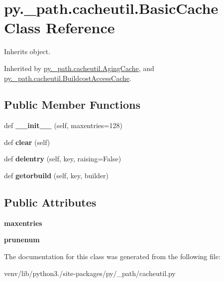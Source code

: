 \hypertarget{classpy_1_1__path_1_1cacheutil_1_1_basic_cache}{}\section{py.\+\_\+path.\+cacheutil.\+Basic\+Cache Class Reference}
\label{classpy_1_1__path_1_1cacheutil_1_1_basic_cache}


Inherits object.



Inherited by \hyperlink{classpy_1_1__path_1_1cacheutil_1_1_aging_cache}{py.\+\_\+path.\+cacheutil.\+Aging\+Cache}, and \hyperlink{classpy_1_1__path_1_1cacheutil_1_1_buildcost_access_cache}{py.\+\_\+path.\+cacheutil.\+Buildcost\+Access\+Cache}.

\subsection*{Public Member Functions}
\begin{DoxyCompactItemize}
\item 
\mbox{\label{classpy_1_1__path_1_1cacheutil_1_1_basic_cache_ac348f541d2a207ebd25786517e507b14}} 
def {\bfseries \+\_\+\+\_\+init\+\_\+\+\_\+} (self, maxentries=128)
\item 
\mbox{\label{classpy_1_1__path_1_1cacheutil_1_1_basic_cache_aa64f5769d6f6d1c17af046d76938e9eb}} 
def {\bfseries clear} (self)
\item 
\mbox{\label{classpy_1_1__path_1_1cacheutil_1_1_basic_cache_a9827fd22fc3df511ccec383e44a812f6}} 
def {\bfseries delentry} (self, key, raising=False)
\item 
\mbox{\label{classpy_1_1__path_1_1cacheutil_1_1_basic_cache_a5378a315b2e89086e34e812cf0c984cf}} 
def {\bfseries getorbuild} (self, key, builder)
\end{DoxyCompactItemize}
\subsection*{Public Attributes}
\begin{DoxyCompactItemize}
\item 
\mbox{\label{classpy_1_1__path_1_1cacheutil_1_1_basic_cache_aa49ced84af344c0dd9505cd1444b0599}} 
{\bfseries maxentries}
\item 
\mbox{\label{classpy_1_1__path_1_1cacheutil_1_1_basic_cache_aea30b34e631e8db02416cf1b3cce8b7a}} 
{\bfseries prunenum}
\end{DoxyCompactItemize}


The documentation for this class was generated from the following file\+:\begin{DoxyCompactItemize}
\item 
venv/lib/python3./site-\/packages/py/\+\_\+path/cacheutil.\+py\end{DoxyCompactItemize}
